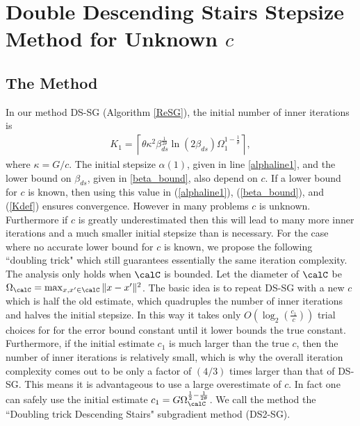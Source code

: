 \documentclass[smallextended]{svjour3}
\begin{document}

 
 \section{Double Descending Stairs Stepsize  Method for Unknown $c$}\label{secAdapt}
  \subsection{The Method}
In our method DS-SG (Algorithm \ref{ReSG}), the initial number of inner iterations is
 \begin{eqnarray}
 \label{Kdef}K_1=
   \left\lceil 
   \theta\kappa^2\beta_{ds}^{\frac{1}{2\theta}}\ln\left(2\beta_{ds}\right)
   \Omega_1^{1-\frac{1}{\theta}}
      \right\rceil,
 \end{eqnarray}
 where $\kappa=G/c$. The initial stepsize $\alpha(1)$, given in line \ref{alphaline1}, and the lower bound on $\beta_{ds}$, given in  \eqref{beta_bound}, also depend on $c$.
 If a lower bound for $c$ is known, then using this value in (\ref{alphaline1}), (\ref{beta_bound}), and (\ref{Kdef}) ensures convergence. However in many problems $c$ is unknown.  Furthermore if $c$ is greatly underestimated then this will lead to many more inner iterations and a much smaller initial stepsize than is necessary. For the case where no accurate lower bound for $c$ is known, we propose the following ``doubling trick" which still guarantees essentially the same iteration complexity. The analysis only holds when $\calC$ is bounded. Let the diameter of $\calC$ be $\Omega_{\calC} = \max_{x,x'\in\calC}\|x-x'\|^2$. The basic idea is to repeat DS-SG with a new $c$ which is half the old estimate, which quadruples the number of inner iterations and halves the initial stepsize. In this way it takes only $O(\log_2(\frac{c_1}{c}))$ trial choices for for the error bound constant until it lower bounds the true constant. Furthermore, if the initial estimate $c_1$ is much larger than the true $c$, then the number of inner iterations is relatively small, which is why the overall iteration complexity comes out to be only a factor of $(4/3)$ times larger than that of DS-SG. This means it is advantageous to use a large  overestimate of $c$. In fact one can safely use the initial estimate $c_1 = G\Omega_{\calC}^{\frac{1}{2}-\frac{1}{2\theta}}$. We call the method the ``Doubling trick Descending Stairs" subgradient method (DS2-SG).
 
\end{document}
